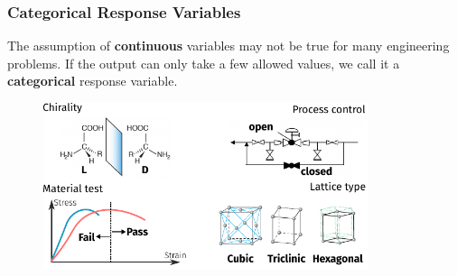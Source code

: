 \documentclass[10pt,aspectratio=169]{beamer}
\begin{document}
\begin{frame}
  \frametitle{Categorical Response Variables}

  The assumption of \textbf{continuous} variables may not be true for
  many engineering problems.  If the output can only take a few
  allowed values, we call it a \textbf{categorical} response variable.

  \begin{figure}
    \includegraphics[width=0.85\textwidth]{images/categorical.pdf}
  \end{figure}




\end{frame}
\end{document}
